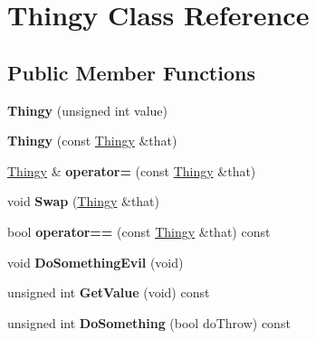 \hypertarget{classThingy}{}\section{Thingy Class Reference}
\label{classThingy}
\subsection*{Public Member Functions}
\begin{DoxyCompactItemize}
\item 
\hypertarget{classThingy_ab734d144864f050f5672467b240f927e}{}{\bfseries Thingy} (unsigned int value)\label{classThingy_ab734d144864f050f5672467b240f927e}

\item 
\hypertarget{classThingy_a443351b48318b480c1b4c1fb9b6f344f}{}{\bfseries Thingy} (const \hyperlink{classThingy}{Thingy} \&that)\label{classThingy_a443351b48318b480c1b4c1fb9b6f344f}

\item 
\hypertarget{classThingy_a4fa9bd589489a5c902defa401284de9f}{}\hyperlink{classThingy}{Thingy} \& {\bfseries operator=} (const \hyperlink{classThingy}{Thingy} \&that)\label{classThingy_a4fa9bd589489a5c902defa401284de9f}

\item 
\hypertarget{classThingy_acbca05c9ddfdf0408d056a2a392b54fe}{}void {\bfseries Swap} (\hyperlink{classThingy}{Thingy} \&that)\label{classThingy_acbca05c9ddfdf0408d056a2a392b54fe}

\item 
\hypertarget{classThingy_a1cbaf7d90f162242fa4cbd125fc9d689}{}bool {\bfseries operator==} (const \hyperlink{classThingy}{Thingy} \&that) const \label{classThingy_a1cbaf7d90f162242fa4cbd125fc9d689}

\item 
\hypertarget{classThingy_a09e1428b65e5e73f595ba8b98b7078ec}{}void {\bfseries Do\+Something\+Evil} (void)\label{classThingy_a09e1428b65e5e73f595ba8b98b7078ec}

\item 
\hypertarget{classThingy_a455cc115813b3fb85b667028ea479a75}{}unsigned int {\bfseries Get\+Value} (void) const \label{classThingy_a455cc115813b3fb85b667028ea479a75}

\item 
\hypertarget{classThingy_a1eb7ccffe6c4409e67e8e6ea86e37a8e}{}unsigned int {\bfseries Do\+Something} (bool do\+Throw) const \label{classThingy_a1eb7ccffe6c4409e67e8e6ea86e37a8e}


\end{DoxyCompactItemize}
